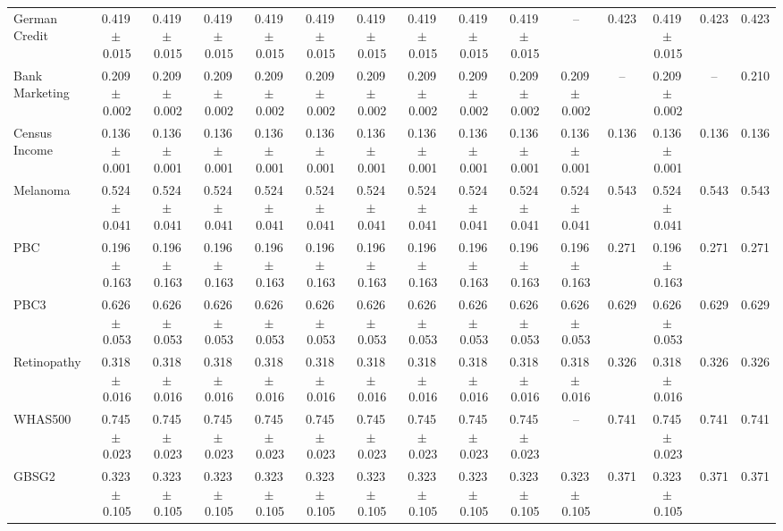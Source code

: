 \documentclass[8pt]{extarticle}
\begin{document}
\begin{longtable}{l*{14}{c}}
German Credit & 0.419\,$\pm$\,0.015 & 0.419\,$\pm$\,0.015 & 0.419\,$\pm$\,0.015 & 0.419\,$\pm$\,0.015 & 0.419\,$\pm$\,0.015 & 0.419\,$\pm$\,0.015 & 0.419\,$\pm$\,0.015 & 0.419\,$\pm$\,0.015 & 0.419\,$\pm$\,0.015 & -- & 0.423 & 0.419\,$\pm$\,0.015 & 0.423 & 0.423 \\
Bank Marketing & 0.209\,$\pm$\,0.002 & 0.209\,$\pm$\,0.002 & 0.209\,$\pm$\,0.002 & 0.209\,$\pm$\,0.002 & 0.209\,$\pm$\,0.002 & 0.209\,$\pm$\,0.002 & 0.209\,$\pm$\,0.002 & 0.209\,$\pm$\,0.002 & 0.209\,$\pm$\,0.002 & 0.209\,$\pm$\,0.002 & -- & 0.209\,$\pm$\,0.002 & -- & 0.210 \\
Census Income & 0.136\,$\pm$\,0.001 & 0.136\,$\pm$\,0.001 & 0.136\,$\pm$\,0.001 & 0.136\,$\pm$\,0.001 & 0.136\,$\pm$\,0.001 & 0.136\,$\pm$\,0.001 & 0.136\,$\pm$\,0.001 & 0.136\,$\pm$\,0.001 & 0.136\,$\pm$\,0.001 & 0.136\,$\pm$\,0.001 & 0.136 & 0.136\,$\pm$\,0.001 & 0.136 & 0.136 \\
Melanoma & 0.524\,$\pm$\,0.041 & 0.524\,$\pm$\,0.041 & 0.524\,$\pm$\,0.041 & 0.524\,$\pm$\,0.041 & 0.524\,$\pm$\,0.041 & 0.524\,$\pm$\,0.041 & 0.524\,$\pm$\,0.041 & 0.524\,$\pm$\,0.041 & 0.524\,$\pm$\,0.041 & 0.524\,$\pm$\,0.041 & 0.543 & 0.524\,$\pm$\,0.041 & 0.543 & 0.543 \\
PBC & 0.196\,$\pm$\,0.163 & 0.196\,$\pm$\,0.163 & 0.196\,$\pm$\,0.163 & 0.196\,$\pm$\,0.163 & 0.196\,$\pm$\,0.163 & 0.196\,$\pm$\,0.163 & 0.196\,$\pm$\,0.163 & 0.196\,$\pm$\,0.163 & 0.196\,$\pm$\,0.163 & 0.196\,$\pm$\,0.163 & 0.271 & 0.196\,$\pm$\,0.163 & 0.271 & 0.271 \\
PBC3 & 0.626\,$\pm$\,0.053 & 0.626\,$\pm$\,0.053 & 0.626\,$\pm$\,0.053 & 0.626\,$\pm$\,0.053 & 0.626\,$\pm$\,0.053 & 0.626\,$\pm$\,0.053 & 0.626\,$\pm$\,0.053 & 0.626\,$\pm$\,0.053 & 0.626\,$\pm$\,0.053 & 0.626\,$\pm$\,0.053 & 0.629 & 0.626\,$\pm$\,0.053 & 0.629 & 0.629 \\
Retinopathy & 0.318\,$\pm$\,0.016 & 0.318\,$\pm$\,0.016 & 0.318\,$\pm$\,0.016 & 0.318\,$\pm$\,0.016 & 0.318\,$\pm$\,0.016 & 0.318\,$\pm$\,0.016 & 0.318\,$\pm$\,0.016 & 0.318\,$\pm$\,0.016 & 0.318\,$\pm$\,0.016 & 0.318\,$\pm$\,0.016 & 0.326 & 0.318\,$\pm$\,0.016 & 0.326 & 0.326 \\
WHAS500 & 0.745\,$\pm$\,0.023 & 0.745\,$\pm$\,0.023 & 0.745\,$\pm$\,0.023 & 0.745\,$\pm$\,0.023 & 0.745\,$\pm$\,0.023 & 0.745\,$\pm$\,0.023 & 0.745\,$\pm$\,0.023 & 0.745\,$\pm$\,0.023 & 0.745\,$\pm$\,0.023 & -- & 0.741 & 0.745\,$\pm$\,0.023 & 0.741 & 0.741 \\
GBSG2 & 0.323\,$\pm$\,0.105 & 0.323\,$\pm$\,0.105 & 0.323\,$\pm$\,0.105 & 0.323\,$\pm$\,0.105 & 0.323\,$\pm$\,0.105 & 0.323\,$\pm$\,0.105 & 0.323\,$\pm$\,0.105 & 0.323\,$\pm$\,0.105 & 0.323\,$\pm$\,0.105 & 0.323\,$\pm$\,0.105 & 0.371 & 0.323\,$\pm$\,0.105 & 0.371 & 0.371 \\

\end{longtable}
\end{document}
